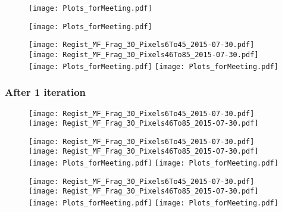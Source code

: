 \documentclass[10pt,dvipsnames,table]{beamer}
\begin{document}
\begin{frame}
\begin{figure}
\texttt{[image: Plots\_forMeeting.pdf]}
\end{figure}
\end{frame}

\begin{frame}
\begin{figure}
\texttt{[image: Plots\_forMeeting.pdf]}
\end{figure}
\end{frame}

\begin{frame}
\begin{figure}
\texttt{[image: Regist\_MF\_Frag\_30\_Pixels6To45\_2015-07-30.pdf]}
\texttt{[image: Regist\_MF\_Frag\_30\_Pixels46To85\_2015-07-30.pdf]} \\
\texttt{[image: Plots\_forMeeting.pdf]}
\texttt{[image: Plots\_forMeeting.pdf]}
\end{figure}
\end{frame}

\begin{frame}
\frametitle{After 1 iteration}
\begin{figure}
\texttt{[image: Regist\_MF\_Frag\_30\_Pixels6To45\_2015-07-30.pdf]}
\texttt{[image: Regist\_MF\_Frag\_30\_Pixels46To85\_2015-07-30.pdf]} \\
\end{figure}
\end{frame}

\begin{frame}
\begin{figure}
\texttt{[image: Regist\_MF\_Frag\_30\_Pixels6To45\_2015-07-30.pdf]}
\texttt{[image: Regist\_MF\_Frag\_30\_Pixels46To85\_2015-07-30.pdf]} \\
\texttt{[image: Plots\_forMeeting.pdf]}
\texttt{[image: Plots\_forMeeting.pdf]}
\end{figure}
\end{frame}

\begin{frame}
\begin{figure}
\texttt{[image: Regist\_MF\_Frag\_30\_Pixels6To45\_2015-07-30.pdf]}
\texttt{[image: Regist\_MF\_Frag\_30\_Pixels46To85\_2015-07-30.pdf]} \\
\texttt{[image: Plots\_forMeeting.pdf]}
\texttt{[image: Plots\_forMeeting.pdf]}
\end{figure}
\end{frame}
\end{document}
